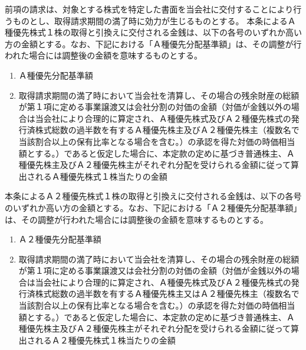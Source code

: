 \documentclass[10pt,a4paper,uplatex]{jsarticle}
\begin{document}
\term 前項の請求は、対象とする株式を特定した書面を当会社に交付することにより行うものとし、取得請求期間の満了時に効力が生じるものとする。
\term 本条によるＡ種優先株式１株の取得と引換えに交付される金銭は、以下の各号のいずれか高い方の金額とする。なお、下記における「Ａ種優先分配基準額」は、その調整が行われた場合には調整後の金額を意味するものとする。
\begin{enumerate}
  \item Ａ種優先分配基準額
  \item 取得請求期間の満了時において当会社を清算し、その場合の残余財産の総額が第１項に定める事業譲渡又は会社分割の対価の金額（対価が金銭以外の場合は当会社により合理的に算定され、Ａ種優先株式及びＡ２種優先株式の発行済株式総数の過半数を有するＡ種優先株主及びＡ２種優先株主（複数名で当該割合以上の保有比率となる場合を含む。）の承認を得た対価の時価相当額とする。）であると仮定した場合に、本定款の定めに基づき普通株主、Ａ種優先株主及びＡ２種優先株主がそれぞれ分配を受けられる金額に従って算出されるＡ種優先株式１株当たりの金額
\end{enumerate}
\term 本条によるＡ２種優先株式１株の取得と引換えに交付される金銭は、以下の各号のいずれか高い方の金額とする。なお、下記における「Ａ２種優先分配基準額」は、その調整が行われた場合には調整後の金額を意味するものとする。
\begin{enumerate}
  \item Ａ２種優先分配基準額
  \item 取得請求期間の満了時において当会社を清算し、その場合の残余財産の総額が第１項に定める事業譲渡又は会社分割の対価の金額（対価が金銭以外の場合は当会社により合理的に算定され、Ａ種優先株式及びＡ２種優先株式の発行済株式総数の過半数を有するＡ種優先株主又はＡ２種優先株主（複数名で当該割合以上の保有比率となる場合を含む。）の承認を得た対価の時価相当額とする。）であると仮定した場合に、本定款の定めに基づき普通株主、Ａ種優先株主及びＡ２種優先株主がそれぞれ分配を受けられる金額に従って算出されるＡ２種優先株式１株当たりの金額
\end{enumerate}
\end{document}
